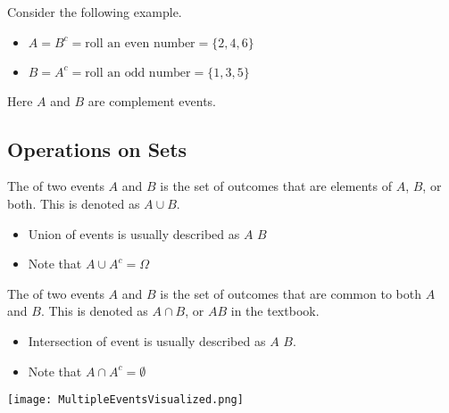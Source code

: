 \begin{example}
    Consider the following example. 

    \begin{itemize}
        \item $A = B^c = \text{roll an even  number} = \{ 2, 4, 6 \}$
        \item $B = A^c = \text{roll an odd number} = \{ 1, 3, 5 \}$
    \end{itemize}

    Here $A$ and $B$ are complement events.
\end{example}

\subsection{Operations on Sets}

\begin{definition}[Union]
    The  of two events $A$ and $B$ is the set of outcomes that are elements of $A$, $B$, or both. This is denoted as $A \cup B$.

    \begin{itemize}
        \item Union of events is usually described as $A$  $B$
        \item Note that $A \cup A^c = \Omega$
    \end{itemize}
\end{definition}


\begin{definition}[Intersection]
    The  of two events $A$ and $B$ is the set of outcomes that are common to both $A$ and $B$. This is denoted as $A \cap B$, or $AB$ in the textbook.

    \begin{itemize}
        \item Intersection of event is usually described as $A$  $B$. 
        \item Note that $A \cap A^c = \emptyset$
    \end{itemize}
\end{definition}

\begin{center} \texttt{[image: MultipleEventsVisualized.png]} \end{center}

